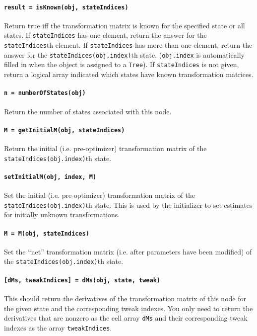 \paragraph{\texttt{result = isKnown(obj, stateIndices)}}
Return true iff the transformation matrix is known for the specified state or all states.
If \texttt{stateIndices} has one element, return the answer for the \texttt{stateIndices}th element.
If \texttt{stateIndices} has more than one element, return the answer for the 
\texttt{stateIndices(obj.index)}th state.
(\texttt{obj.index} is automatically filled in when the object is assigned to a \texttt{Tree}).
If \texttt{stateIndices} is not given, return a logical array indicated which states have known 
transformation matrices.

\paragraph{\texttt{n = numberOfStates(obj)}}
Return the number of states associated with this node.

\paragraph{\texttt{M = getInitialM(obj, stateIndices)}}
Return the initial (i.e. pre-optimizer) transformation matrix of the \texttt{stateIndices(obj.index)}th state.

\paragraph{\texttt{setInitialM(obj, index, M)}}
Set the initial (i.e. pre-optimizer) transformation matrix of the \texttt{stateIndices(obj.index)}th state.
This is used by the initializer to set estimates for initially unknown transformations.

\paragraph{\texttt{M = M(obj, stateIndices)}}
Set the ``net'' transformation matrix (i.e. after parameters have been modified) of the \texttt{stateIndices(obj.index)}th state.

\paragraph{\texttt{[dMs, tweakIndices] = dMs(obj, state, tweak)}}
This should return the derivatives of the transformation matrix of this node for the given state
and the corresponding tweak indexes. You only need to return 
the derivatives that are nonzero as the cell array \texttt{dMs} and their corresponding tweak indexes 
as the array \texttt{tweakIndices}.
